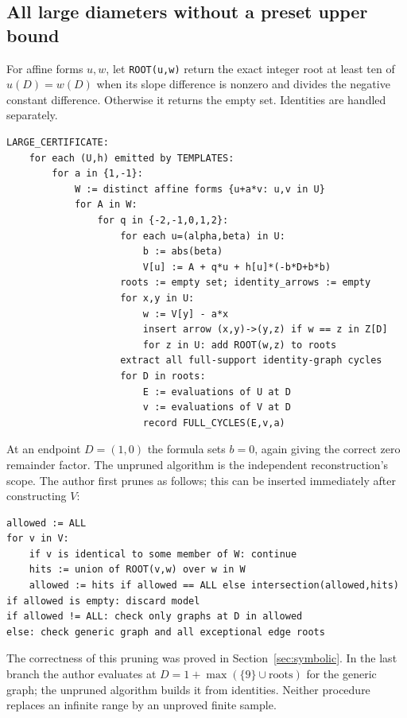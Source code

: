 \subsection{All large diameters without a preset upper bound}
For affine forms $u,w$, let \texttt{ROOT(u,w)} return the exact
integer root at least ten of $u(D)=w(D)$ when its slope difference
is nonzero and divides the negative constant difference. Otherwise
it returns the empty set. Identities are handled separately.
\begin{Verbatim}[fontsize=\small]
LARGE_CERTIFICATE:
    for each (U,h) emitted by TEMPLATES:
        for a in {1,-1}:
            W := distinct affine forms {u+a*v: u,v in U}
            for A in W:
                for q in {-2,-1,0,1,2}:
                    for each u=(alpha,beta) in U:
                        b := abs(beta)
                        V[u] := A + q*u + h[u]*(-b*D+b*b)
                    roots := empty set; identity_arrows := empty
                    for x,y in U:
                        w := V[y] - a*x
                        insert arrow (x,y)->(y,z) if w == z in Z[D]
                        for z in U: add ROOT(w,z) to roots
                    extract all full-support identity-graph cycles
                    for D in roots:
                        E := evaluations of U at D
                        v := evaluations of V at D
                        record FULL_CYCLES(E,v,a)
\end{Verbatim}
At an endpoint $D=(1,0)$ the formula sets $b=0$, again giving the
correct zero remainder factor. The unpruned algorithm is the
independent reconstruction's scope. The author first prunes as
follows; this can be inserted immediately after constructing $V$:
\begin{Verbatim}[fontsize=\small]
allowed := ALL
for v in V:
    if v is identical to some member of W: continue
    hits := union of ROOT(v,w) over w in W
    allowed := hits if allowed == ALL else intersection(allowed,hits)
if allowed is empty: discard model
if allowed != ALL: check only graphs at D in allowed
else: check generic graph and all exceptional edge roots
\end{Verbatim}
The correctness of this pruning was proved in
Section~\ref{sec:symbolic}. In the last branch the author evaluates
at $D=1+\max(\{9\}\cup\mathrm{roots})$ for the generic graph;
the unpruned algorithm builds it from identities. Neither procedure
replaces an infinite range by an unproved finite sample.
